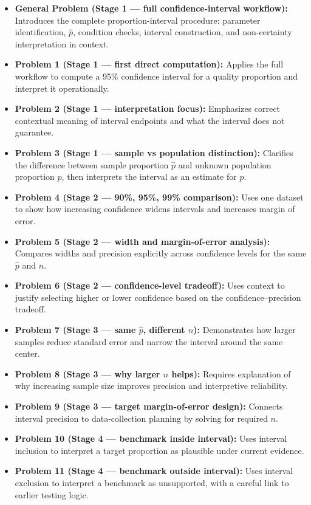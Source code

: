\begin{itemize}
    \item \textbf{General Problem (Stage 1 --- full confidence-interval workflow):} Introduces the complete proportion-interval procedure: parameter identification, \(\hat p\), condition checks, interval construction, and non-certainty interpretation in context.
    \item \textbf{Problem 1 (Stage 1 --- first direct computation):} Applies the full workflow to compute a 95\% confidence interval for a quality proportion and interpret it operationally.
    \item \textbf{Problem 2 (Stage 1 --- interpretation focus):} Emphasizes correct contextual meaning of interval endpoints and what the interval does not guarantee.
    \item \textbf{Problem 3 (Stage 1 --- sample vs population distinction):} Clarifies the difference between sample proportion \(\hat p\) and unknown population proportion \(p\), then interprets the interval as an estimate for \(p\).
    \item \textbf{Problem 4 (Stage 2 --- 90\%, 95\%, 99\% comparison):} Uses one dataset to show how increasing confidence widens intervals and increases margin of error.
    \item \textbf{Problem 5 (Stage 2 --- width and margin-of-error analysis):} Compares widths and precision explicitly across confidence levels for the same \(\hat p\) and \(n\).
    \item \textbf{Problem 6 (Stage 2 --- confidence-level tradeoff):} Uses context to justify selecting higher or lower confidence based on the confidence--precision tradeoff.
    \item \textbf{Problem 7 (Stage 3 --- same \(\hat p\), different \(n\)):} Demonstrates how larger samples reduce standard error and narrow the interval around the same center.
    \item \textbf{Problem 8 (Stage 3 --- why larger \(n\) helps):} Requires explanation of why increasing sample size improves precision and interpretive reliability.
    \item \textbf{Problem 9 (Stage 3 --- target margin-of-error design):} Connects interval precision to data-collection planning by solving for required \(n\).
    \item \textbf{Problem 10 (Stage 4 --- benchmark inside interval):} Uses interval inclusion to interpret a target proportion as plausible under current evidence.
    \item \textbf{Problem 11 (Stage 4 --- benchmark outside interval):} Uses interval exclusion to interpret a benchmark as unsupported, with a careful link to earlier testing logic.

\end{itemize}
